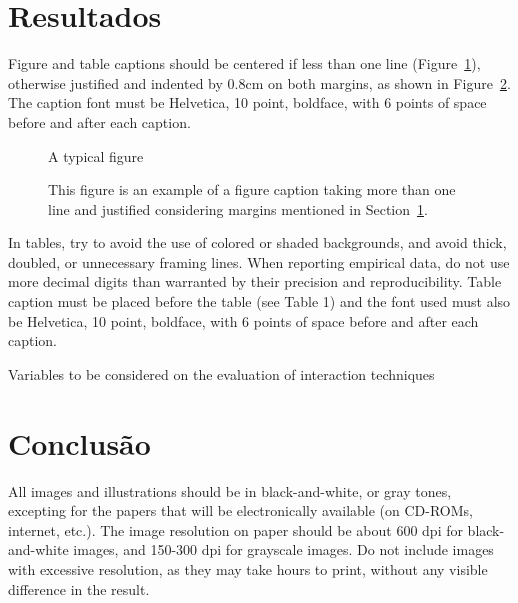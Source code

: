 \documentclass[12pt]{article}
\begin{document}
\section{Resultados}\label{sec:figs}


Figure and table captions should be centered if less than one line
(Figure~\ref{fig:exampleFig1}), otherwise justified and indented by 0.8cm on
both margins, as shown in Figure~\ref{fig:exampleFig2}. The caption font must be
Helvetica, 10 point, boldface, with 6 points of space before and after each
caption.

\begin{figure}[ht]
\centering
\caption{A typical figure}
\label{fig:exampleFig1}
\end{figure}

\begin{figure}[ht]
\centering
\caption{This figure is an example of a figure caption taking more than one line
  and justified considering margins mentioned in Section~\ref{sec:figs}.}
\label{fig:exampleFig2}
\end{figure}

In tables, try to avoid the use of colored or shaded backgrounds, and avoid
thick, doubled, or unnecessary framing lines. When reporting empirical data, do
not use more decimal digits than warranted by their precision and
reproducibility. Table caption must be placed before the table (see Table 1) and
the font used must also be Helvetica, 10 point, boldface, with 6 points of space
before and after each caption.

\begin{table}[ht]
\centering
\caption{Variables to be considered on the evaluation of interaction techniques}
\label{tab:exTable1}
\end{table}

\section{Conclusão}

All images and illustrations should be in black-and-white, or gray tones,
excepting for the papers that will be electronically available (on CD-ROMs,
internet, etc.). The image resolution on paper should be about 600 dpi for
black-and-white images, and 150-300 dpi for grayscale images.  Do not include
images with excessive resolution, as they may take hours to print, without any
visible difference in the result. 



\end{document}
